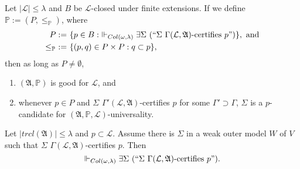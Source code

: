 \documentclass[12pt]{article}
\numberwithin{equation}{section}
\begin{document}
\begin{prop}\label{certgood}
Let $|\mathcal{L}| \leq \lambda$ and $B$ be $\mathcal{L}$-closed under finite extensions. If we define $\mathbb{P} := (P, \leq_{\mathbb{P}})$, where
\begin{align*}
    P := \ & \{p \in B : \ \Vdash_{Col(\omega, \lambda)} \exists \Sigma \ (``\Sigma \ \Gamma(\mathcal{L}, \mathfrak{A}) \text{-certifies } p")\}, \text{ and} \\
    \leq_{\mathbb{P}} \ := \ & \{(p, q) \in P \times P : q \subset p\},
\end{align*}
then as long as $P \neq \emptyset$, 
\begin{enumerate}[label=(\alph*)]
    \item $(\mathfrak{A}, \mathbb{P})$ is good for $\mathcal{L}$, and
    \item whenever $p \in P$ and $\Sigma$ $\Gamma'(\mathcal{L}, \mathfrak{A})$-certifies $p$ for some $\Gamma' \supset \Gamma$, $\Sigma$ is a $p$-candidate for $(\mathfrak{A}, \mathbb{P}, \mathcal{L})$-universality.
\end{enumerate}
\end{prop}

\begin{lem}\label{inout}
Let $|trcl(\mathfrak{A})| \leq \lambda$ and $p \subset \mathcal{L}$. Assume there is $\Sigma$ in a weak outer model $W$ of $V$ such that $\Sigma$ $\Gamma(\mathcal{L}, \mathfrak{A})$-certifies $p$. Then $$\Vdash_{Col(\omega, \lambda)} \exists \Sigma \ (``\Sigma \ \Gamma(\mathcal{L}, \mathfrak{A}) \text{-certifies } p").$$
\end{lem}
\end{document}
